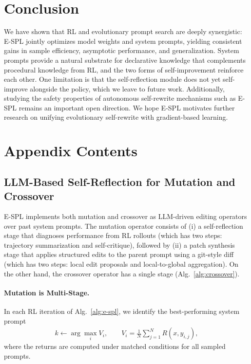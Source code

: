 \documentclass{article}
\theoremstyle{plain}
\theoremstyle{definition}
\theoremstyle{remark}
\begin{document}
\section{Conclusion}
We have shown that RL and evolutionary prompt search are deeply synergistic: E-SPL jointly optimizes model weights and system prompts, yielding consistent gains in sample efficiency, asymptotic performance, and generalization. System prompts provide a natural substrate for declarative knowledge that complements procedural knowledge from RL, and the two forms of self-improvement reinforce each other. One limitation is that the self-reflection module does not yet self-improve alongside the policy, which we leave to future work. Additionally, studying the safety properties of autonomous self-rewrite mechanisms such as E-SPL remains an important open direction. We hope E-SPL motivates further research on unifying evolutionary self-rewrite with gradient-based learning.

\begin{ack}
\end{ack}

\clearpage
\newpage





\newpage


\newpage
\appendix
\section{Appendix Contents}

\subsection{LLM-Based Self-Reflection for Mutation and Crossover}
\label{sec:appendix-self-reflection}

E-SPL implements both mutation and crossover as LLM-driven editing operators over past system prompts. The mutation operator consists of (i) a self-reflection stage that diagnoses performance from RL rollouts (which has two steps: trajectory summarization and self-critique), followed by (ii) a patch synthesis stage that applies structured edits to the parent prompt using a git-style diff (which has two steps: local edit proposals and local-to-global aggregation). On the other hand, the crossover operator has a single stage (Alg.~\ref{alg:crossover}).

\paragraph{Mutation is Multi-Stage.}
In each RL iteration of Alg.~\ref{alg:e-spl}, we identify the best-performing system prompt
\begin{align}
k \leftarrow \arg\max_i V_i, \qquad V_i = \frac{1}{N}\sum_{j=1}^N R(x,y_{i,j}),
\end{align}
where the returns are computed under matched conditions for all sampled prompts.
\end{document}
